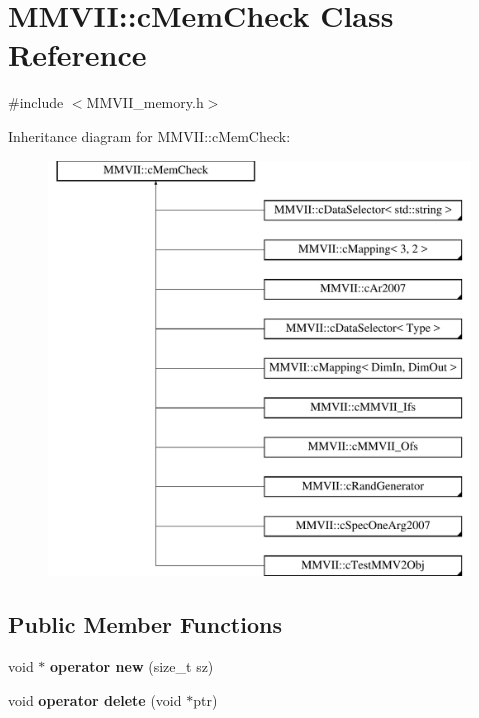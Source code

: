 \hypertarget{classMMVII_1_1cMemCheck}{}\section{M\+M\+V\+II\+:\+:c\+Mem\+Check Class Reference}
\label{classMMVII_1_1cMemCheck}


{\ttfamily \#include $<$M\+M\+V\+I\+I\+\_\+memory.\+h$>$}

Inheritance diagram for M\+M\+V\+II\+:\+:c\+Mem\+Check\+:\begin{figure}[H]
\begin{center}
\leavevmode
\includegraphics[height=11.000000cm]{classMMVII_1_1cMemCheck}
\end{center}
\end{figure}
\subsection*{Public Member Functions}
\begin{DoxyCompactItemize}
\item 
void $\ast$ {\bfseries operator new} (size\+\_\+t sz)\hypertarget{classMMVII_1_1cMemCheck_ae28b81493cdb9d282ee78e5734996add}{}\label{classMMVII_1_1cMemCheck_ae28b81493cdb9d282ee78e5734996add}

\item 
void {\bfseries operator delete} (void $\ast$ptr)\hypertarget{classMMVII_1_1cMemCheck_af2f86b9d9cb9993c90254776b0105ec6}{}\label{classMMVII_1_1cMemCheck_af2f86b9d9cb9993c90254776b0105ec6}

\end{DoxyCompactItemize}
